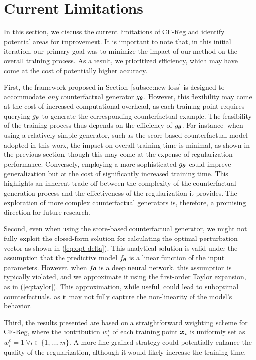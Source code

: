 \section{Current Limitations}
\label{sec:discussion}
In this section, we discuss the current limitations of CF-Reg and identify potential areas for improvement. It is important to note that, in this initial iteration, our primary goal was to minimize the impact of our method on the overall training process. As a result, we prioritized efficiency, which may have come at the cost of potentially higher accuracy.

First, the framework proposed in Section~\ref{subsec:new-loss} is designed to accommodate \textit{any} counterfactual generator $g_{\boldsymbol{\theta}}$. However, this flexibility may come at the cost of increased computational overhead, as each training point requires querying $g_{\boldsymbol{\theta}}$ to generate the corresponding counterfactual example. The feasibility of the training process thus depends on the efficiency of $g_{\boldsymbol{\theta}}$. For instance, when using a relatively simple generator, such as the score-based counterfactual model adopted in this work, the impact on overall training time is minimal, as shown in the previous section, though this may come at the expense of regularization performance. Conversely, employing a more sophisticated $g_{\boldsymbol{\theta}}$ could improve generalization but at the cost of significantly increased training time. This highlights an inherent trade-off between the complexity of the counterfactual generation process and the effectiveness of the regularization it provides. The exploration of more complex counterfactual generators is, therefore, a promising direction for future research.

Second, even when using the score-based counterfactual generator, we might not fully exploit the closed-form solution for calculating the optimal perturbation vector as shown in (\ref{eq:opt-delta}). This analytical solution is valid under the assumption that the predictive model $f_{\boldsymbol{\theta}}$ is a linear function of the input parameters. However, when $f_{\boldsymbol{\theta}}$ is a deep neural network, this assumption is typically violated, and we approximate it using the first-order Taylor expansion, as in (\ref{eq:taylor}). This approximation, while useful, could lead to suboptimal counterfactuals, as it may not fully capture the non-linearity of the model's behavior.

Third, the results presented are based on a straightforward weighting scheme for CF-Reg, where the contribution $w_i^{\varepsilon}$ of each training point $\boldsymbol{x}_i$ is uniformly set as $w_i^{\varepsilon} = 1~\forall i\in \{1,\ldots,m\}$. A more fine-grained strategy could potentially enhance the quality of the regularization, although it would likely increase the training time.
